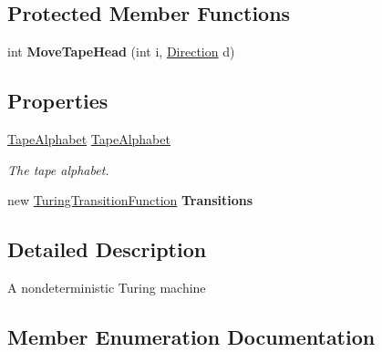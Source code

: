 \subsection*{Protected Member Functions}
\begin{DoxyCompactItemize}
\item 
\mbox{\label{class_system_1_1_automata_1_1_turing_machine_ad58e324621c3250dc8b5158c8ead621f}} 
int {\bfseries Move\+Tape\+Head} (int i, \mbox{\hyperlink{class_system_1_1_automata_1_1_turing_machine_aa253c3820befa3cfdd3d17b2d8fdd2d9}{Direction}} d)
\end{DoxyCompactItemize}
\subsection*{Properties}
\begin{DoxyCompactItemize}
\item 
\mbox{\hyperlink{class_system_1_1_automata_1_1_tape_alphabet}{Tape\+Alphabet}} \mbox{\hyperlink{class_system_1_1_automata_1_1_turing_machine_a6f92addf3d029757073431b5b4758cdb}{Tape\+Alphabet}}
\begin{DoxyCompactList}\small\item\em The tape alphabet. \end{DoxyCompactList}\item 
\mbox{\label{class_system_1_1_automata_1_1_turing_machine_a7852b38b2d6a3f734ff2075bb2c3831b}} 
new \mbox{\hyperlink{class_system_1_1_automata_1_1_turing_transition_function}{Turing\+Transition\+Function}} {\bfseries Transitions}
\end{DoxyCompactItemize}


\subsection{Detailed Description}
A nondeterministic Turing machine 



\subsection{Member Enumeration Documentation}
\mbox{\label{class_system_1_1_automata_1_1_turing_machine_aa253c3820befa3cfdd3d17b2d8fdd2d9}} 
